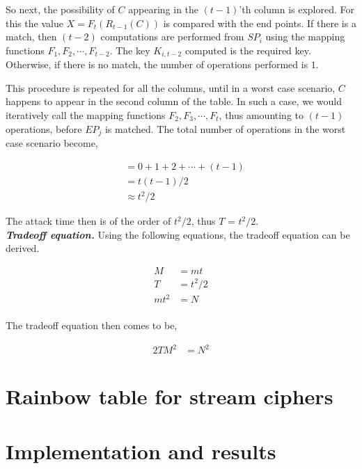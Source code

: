 So next, the possibility of $C$ appearing in the $(t-1)$'th column is explored. For this the value $X = F_{t}(R_{t-1}(C))$ is compared with the end points. If there is a match, then $(t-2)$ computations are performed from $SP_{i}$ using the mapping functions $F_1, F_2, \cdots, F_{t-2}$. The key $K_{i,t-2}$ computed is the required key. Otherwise, if there is no match, the number of operations performed is $1$.

This procedure is repeated for all the columns, until in a worst case scenario, $C$ happens to appear in the second column of the table. In such a case, we would iteratively call the mapping functions $F_2, F_3, \cdots, F_t$, thus amounting to $(t-1)$ operations, before $EP_j$ is matched. The total number of operations in the worst case scenario become, 

\begin{align*}
&= 0 + 1 + 2 + \cdots + (t-1)\\
&= t(t-1)/2\\
&\approx t^2/2
\end{align*}

The attack time then is of the order of $t^2/2$, thus $T$ = $t^2/2$.\\


\noindent \textit{\textbf{Tradeoff equation.}} Using the following equations, the tradeoff equation can be derived. 

\begin{align*}
M &= mt\\
T &= t^2/2\\
mt^2 &= N\\
\end{align*}

The tradeoff equation then comes to be,

\begin{align}
\label{eq:tmdto-rainbow-block} 2TM^2 &= N^2
\end{align}


\section{Rainbow table for stream ciphers}
\label{sec:rainbow-stream}


\section{Implementation and results}
\label{sec:rainbow-impl}
